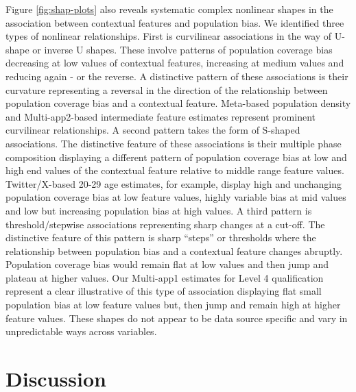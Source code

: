 \documentclass[]{rsos}%
\begin{document}
Figure \ref{fig:shap-plots} also reveals systematic complex nonlinear
shapes in the association between contextual features and population
bias. We identified three types of nonlinear relationships. First is
curvilinear associations in the way of U-shape or inverse U shapes.
These involve patterns of population coverage bias decreasing at low values of
contextual features, increasing at medium values and reducing again - or
the reverse. A distinctive pattern of these associations is their
curvature representing a reversal in the direction of the relationship
between population coverage bias and a contextual feature. Meta-based population
density and Multi-app2-based intermediate feature estimates represent
prominent curvilinear relationships. A second pattern takes the form of
S-shaped associations. The distinctive feature of these associations is
their multiple phase composition displaying a different pattern of
population coverage bias at low and high end values of the contextual feature
relative to middle range feature values. Twitter/X-based 20-29 age
estimates, for example, display high and unchanging population coverage bias at
low feature values, highly variable bias at mid values and low but
increasing population bias at high values. A third pattern is
threshold/stepwise associations representing sharp changes at a cut-off.
The distinctive feature of this pattern is sharp ``steps'' or thresholds
where the relationship between population bias and a contextual feature
changes abruptly. Population coverage bias would remain flat at low values and
then jump and plateau at higher values. Our Multi-app1 estimates for
Level 4 qualification represent a clear illustrative of this type of
association displaying flat small population bias at low feature values
but, then jump and remain high at higher feature values. These shapes do
not appear to be data source specific and vary in unpredictable ways
across variables.

\section{Discussion}\label{discussion}
\end{document}
